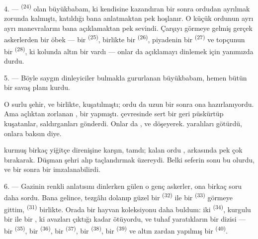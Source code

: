 \VUsaut{4.0mm}
\VUsaut{2.8mm}

4. ---  \textsuperscript{(24)} olan büyükbabam, ki
kendisine  kazandıran bir  sonra
ordudan ayrılmak zorunda kalmıştı, katıldığı  bana
anlatmaktan pek hoşlanır. O küçük ordunun ayrı ayrı manevralarını bana
açıklamaktan pek sevindi. Çarşıyı görmeye gelmiş gerçek askerlerden bir öbek
--- bir  \textsuperscript{(25)}, 
birlikte bir  \textsuperscript{(26)}, piyadenin bir
 \textsuperscript{(27)} ve topçunun bir 
\textsuperscript{(28)}, ki kolunda altın bir  vardı --- onlar da
açıklamayı dinlemek için yanımızda durdu.

5. --- Böyle saygın dinleyiciler bulmakla gururlanan büyükbabam, hemen bütün
bir savaş planı kurdu.

O surlu şehir,  ve  birlikte,
 kuşatılmıştı; ordu da uzun bir  sonra ona  hazırlanıyordu. Ama açlıktan
zorlanan ,   bir
 yapmıştı.  çevresinde sert bir
  geri püskürtüp 
kuşatanlar,  saldırganları   gönderdi. Onlar da ,
  ve  döşeyerek.
 yaralıları  götürdü,
 onlara baksın diye.

 kurmuş birkaç  yiğitçe direnişine karşın,
 tamdı; kalan ordu , arkasında pek çok
 bırakarak. Düşman şehri alıp  taçlandırmak
üzereydi. Belki seferin sonu bu olurdu, ve bir  sonra bir
 imzalanabilirdi.

\VUsaut{4.4mm}
\VUsaut{2.8mm}

6. --- Gazinin renkli anlatısını dinlerken gülen o genç askerler, ona birkaç
soru daha sordu. Bana gelince, tezgâhı dolanıp güzel bir 
\textsuperscript{(32)} ile bir  \textsuperscript{(33)} görmeye
gittim,  \textsuperscript{(31)} birlikte. Orada bir hayvan
koleksiyonu daha buldum: iki  \textsuperscript{(34)},
kurgulu bir  ile bir , ki avazları çıktığı
kadar ötüyordu, ve tuhaf yaratıkların bir dizisi --- bir 
\textsuperscript{(35)}, bir  \textsuperscript{(36)}, bir
 \textsuperscript{(37)}, bir 
\textsuperscript{(38)}, bir  \textsuperscript{(39)} ve altın
zardan yapılmış bir  \textsuperscript{(40)}.

